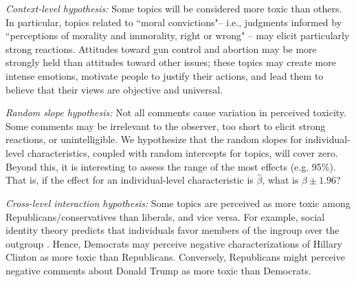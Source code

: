 \documentclass{article}
\begin{document}
\textit{Context-level hypothesis:} Some topics will be considered more toxic than others. In particular, topics related to ``moral convictions"-- i.e., judgments informed by ``perceptions of morality and immorality, right or wrong" \citep{skitka_conviction_2010} -- may elicit particularly strong reactions. Attitudes toward gun control and abortion may be more strongly held than attitudes toward other issues; these topics may create more intense emotions, motivate people to justify their actions, and lead them to believe that their views are objective and universal. 

\textit{Random slope hypothesis:} Not all comments cause variation in perceived toxicity. Some comments may be irrelevant to the observer, too short to elicit strong reactions, or unintelligible. We hypothesize that the random slopes for individual-level characteristics, coupled with random intercepts for topics, will cover zero. Beyond this, it is interesting to assess the range of the most effects (e.g. 95\%). That is, if the effect for an individual-level characteristic is $\hat \beta$, what is $\beta\pm 1.96$?

\textit{Cross-level interaction hypothesis:} Some topics are perceived as more toxic among Republicans/conservatives than liberals, and vice versa. For example, social identity theory predicts that individuals favor members of the ingroup over the outgroup \citep{tafjelturner_identity_2004}. Hence, Democrats may perceive negative characterizations of Hillary Clinton as more toxic than Republicans. Conversely, Republicans might perceive negative comments about Donald Trump as more toxic than Democrats.








\end{document}
